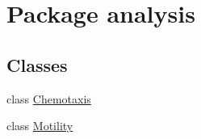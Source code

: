 \hypertarget{namespaceanalysis}{}\section{Package analysis}
\label{namespaceanalysis}
\subsection*{Classes}
\begin{DoxyCompactItemize}
\item 
class \hyperlink{classanalysis_1_1_chemotaxis}{Chemotaxis}
\item 
class \hyperlink{classanalysis_1_1_motility}{Motility}
\end{DoxyCompactItemize}
